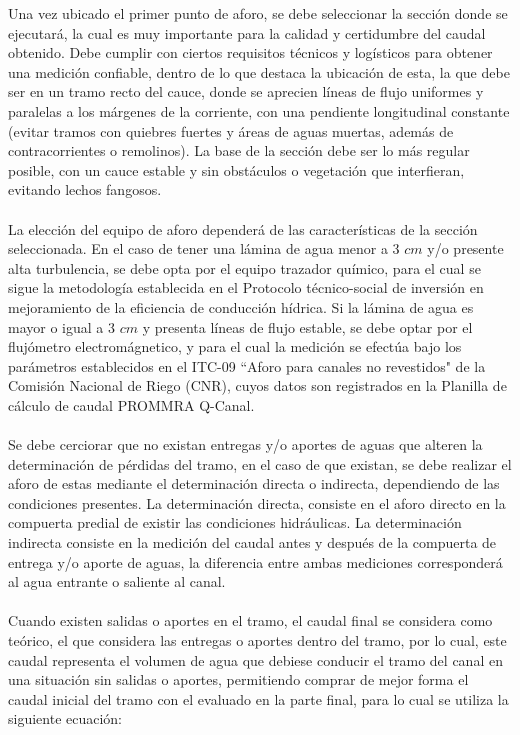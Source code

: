 \documentclass[]{article}
\begin{document}
Una vez ubicado el primer punto de aforo, se debe seleccionar la sección donde se ejecutará, la cual es muy importante para la calidad y certidumbre del caudal obtenido. Debe cumplir con ciertos requisitos técnicos y logísticos para obtener una medición confiable, dentro de lo que destaca la ubicación de esta, la que debe ser en un tramo recto del cauce, donde se aprecien líneas de flujo uniformes y paralelas a los márgenes de la corriente, con una pendiente longitudinal constante (evitar tramos con quiebres fuertes y áreas de aguas muertas, además de contracorrientes o remolinos). La base de la sección debe ser lo más regular posible, con un cauce estable y sin obstáculos o vegetación que interfieran, evitando lechos fangosos. \\
\\
La elección del equipo de aforo dependerá de las características de la sección seleccionada. En el caso de tener una lámina de agua menor a 3 $cm$ y/o presente alta turbulencia, se debe opta por el equipo trazador químico, para el cual se sigue la metodología establecida en el Protocolo técnico-social de inversión en mejoramiento de la eficiencia de conducción hídrica. Si la lámina de agua es mayor o igual a 3 $cm$ y presenta líneas de flujo estable, se debe optar por el flujómetro electromágnetico, y para el cual la medición se efectúa bajo los parámetros establecidos en el ITC-09 ``Aforo para canales no revestidos" de la Comisión Nacional de Riego (CNR), cuyos datos son registrados en la Planilla de cálculo de caudal PROMMRA Q-Canal. \\
\\
Se debe cerciorar que no existan entregas y/o aportes de aguas que alteren la determinación de pérdidas del tramo, en el caso de que existan, se debe realizar el aforo de estas mediante el determinación directa o indirecta, dependiendo de las condiciones presentes. La determinación directa, consiste en el aforo directo en la compuerta predial de existir las condiciones hidráulicas. La determinación indirecta consiste en la medición del caudal antes y después de la compuerta de entrega y/o aporte de aguas, la diferencia entre ambas mediciones corresponderá al agua entrante o saliente al canal. \\
\\
Cuando existen salidas o aportes en el tramo, el caudal final se considera como teórico, el que considera las entregas o aportes dentro del tramo, por lo cual, este caudal representa el volumen de agua que debiese conducir el tramo del canal en una situación sin salidas o aportes, permitiendo comprar de mejor forma el caudal inicial del tramo con el evaluado en la parte final, para lo cual se utiliza la siguiente ecuación:
\end{document}
